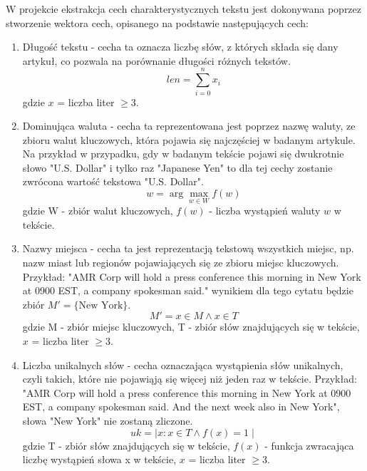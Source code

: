 \documentclass{article}
\begin{document}
W projekcie ekstrakcja cech charakterystycznych tekstu jest dokonywana poprzez stworzenie wektora cech, opisanego na podstawie następujących cech:
\begin{enumerate}
    \item Długość tekstu - cecha ta oznacza liczbę słów, z których składa się dany artykuł, co pozwala na porównanie długości różnych tekstów.
        \begin{equation}
            len = \sum_{i=0}^{n} x_i
        \end{equation}
        gdzie \( x \) = liczba liter \( \geq 3 \).
    \item Dominująca waluta - cecha ta reprezentowana jest poprzez nazwę waluty, ze zbioru walut kluczowych, która pojawia się najczęściej w badanym artykule. Na przykład w przypadku, gdy w badanym tekście pojawi się dwukrotnie słowo "U.S. Dollar" i tylko raz "Japanese Yen" to dla tej cechy zostanie zwrócona wartość tekstowa "U.S. Dollar".
        \begin{equation}
            w = \arg\max_{w \in W} f(w)
        \end{equation}
        gdzie W - zbiór walut kluczowych, \( f(w) \)  - liczba wystąpień waluty \( w \) w tekście.
    \item Nazwy miejsca - cecha ta jest reprezentacją tekstową wszystkich miejsc, np. nazw miast lub regionów pojawiających się ze zbioru miejsc kluczowych. Przykład: "AMR Corp will hold a press conference this morning in New York at 0900 EST, a company spokesman said." wynikiem dla tego cytatu będzie zbiór \( M' = \{ \text{New York} \} \). 
        \begin{equation}
            M' =  x \in M  \land x \in T
        \end{equation}
        gdzie M - zbiór miejsc kluczowych, T - zbiór słów znajdujących się w tekście, \( x \) = liczba liter \( \geq 3 \).
    \item Liczba unikalnych słów - cecha oznaczająca wystąpienia słów unikalnych, czyli takich, które nie pojawiąją się więcej niż jeden raz w tekście. Przykład: "AMR Corp will hold a press conference this morning in New York at 0900 EST, a company spokesman said. And the next week also in New York", słowa "New York" nie zostaną zliczone.
        \begin{equation}
            uk = \mid x : x \in T \land f(x) = 1 \mid
        \end{equation}
        gdzie T - zbiór słów znajdujących się w tekście, \( f(x)\)  - funkcja zwracająca liczbę wystąpień słowa x w tekście, \( x \) = liczba liter \( \geq 3 \).

\end{enumerate}
\end{document}
